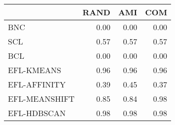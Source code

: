 \begin{tabular}{lrrr}
\toprule
 & RAND & AMI & COM \\
\midrule
BNC & 0.00 & 0.00 & 0.00 \\
SCL & 0.57 & 0.57 & 0.57 \\
BCL & 0.00 & 0.00 & 0.00 \\
EFL-KMEANS & 0.96 & 0.96 & 0.96 \\
EFL-AFFINITY & 0.39 & 0.45 & 0.37 \\
EFL-MEANSHIFT & 0.85 & 0.84 & 0.98 \\
EFL-HDBSCAN & 0.98 & 0.98 & 0.98 \\
\bottomrule
\end{tabular}
